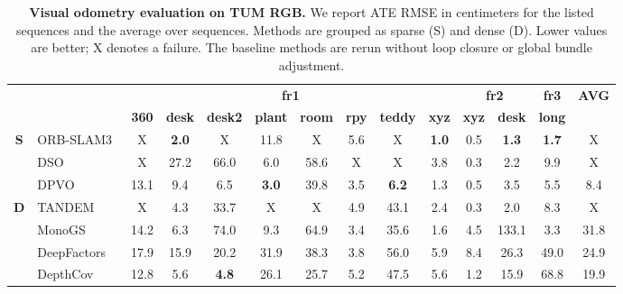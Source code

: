 \begin{table}[!t]
    \centering
    \caption{\textbf{Visual odometry evaluation on TUM RGB.}
    We report ATE RMSE in centimeters for the listed sequences and the average over sequences.
    Methods are grouped as sparse (S) and dense (D).
    Lower values are better; \textnormal{X} denotes a failure. The baseline methods are rerun without loop closure or global bundle adjustment.}
    \label{tab:geont_vo_eval}
    \scriptsize
    \setlength{\tabcolsep}{2.5pt}
    \renewcommand{\arraystretch}{1.08}
    \begin{tabular*}{\textwidth}{@{\extracolsep{\fill}}cl|cccccccc|cc|c|c@{}}
        \toprule
        & & \multicolumn{8}{c|}{\textbf{fr1}} & \multicolumn{2}{c|}{\textbf{fr2}} & \multicolumn{1}{c|}{\textbf{fr3}} & \textbf{AVG} \\
        & & \textbf{360} & \textbf{desk} & \textbf{desk2} & \textbf{plant} & \textbf{room} & \textbf{rpy} & \textbf{teddy} & \textbf{xyz} & \textbf{xyz} & \textbf{desk} & \textbf{long} & \\
        \midrule
        \multirow{3}{*}{\textbf{S}} & ORB-SLAM3~\cite{campos2021orb} & X & \cellcolor{red!25}\textbf{2.0} & X & 11.8 & X & 5.6 & X & \cellcolor{red!25}\textbf{1.0} & 0.5 & \cellcolor{red!25}\textbf{1.3} & \cellcolor{red!25}\textbf{1.7} & X \\
        & DSO~\cite{engel2017direct} & X & 27.2 & 66.0 & 6.0 & 58.6 & X & X & 3.8 & \cellcolor{yellow!25}0.3 & 2.2 & 9.9 & X \\
        & DPVO~\cite{lipson2024deep} & 13.1 & 9.4 & \cellcolor{yellow!25}6.5 & \cellcolor{red!25}\textbf{3.0} & 39.8 & 3.5 & \cellcolor{red!25}\textbf{6.2} & 1.3 & 0.5 & 3.5 & 5.5 & \cellcolor{yellow!25}8.4 \\
        \midrule
        \multirow{9}{*}{\textbf{D}} & TANDEM~\cite{koestler2022tandem} & X & 4.3 & 33.7 & X & X & 4.9 & 43.1 & 2.4 & \cellcolor{yellow!25}0.3 & \cellcolor{yellow!25}2.0 & 8.3 & X \\
        & MonoGS~\cite{matsuki2024gaussian} & 14.2 & 6.3 & 74.0 & 9.3 & 64.9 & 3.4 & 35.6 & 1.6 & 4.5 & 133.1 & \cellcolor{yellow!25}3.3 & 31.8 \\
        & DeepFactors~\cite{czarnowski2020deepfactors} & 17.9 & 15.9 & 20.2 & 31.9 & 38.3 & 3.8 & 56.0 & 5.9 & 8.4 & 26.3 & 49.0 & 24.9 \\
        & DepthCov~\cite{dexheimer2023learning} & \cellcolor{yellow!25}12.8 & 5.6 & \cellcolor{red!25}\textbf{4.8} & 26.1 & \cellcolor{yellow!25}25.7 & 5.2 & 47.5 & 5.6 & 1.2 & 15.9 & 68.8 & 19.9 \\

\end{tabular*}
\end{table}

